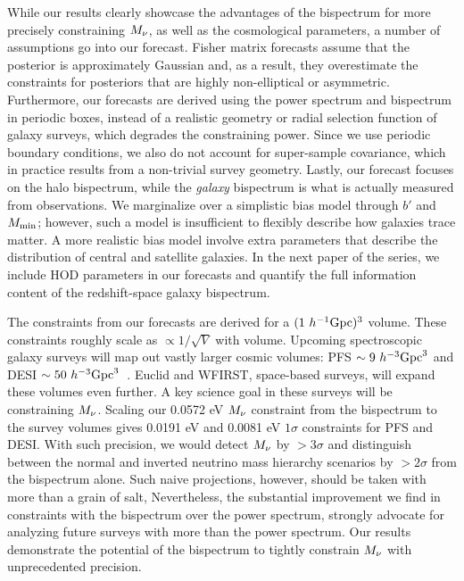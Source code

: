 While our results clearly showcase the advantages of the bispectrum for
more precisely constraining $M_\nu$, as well as the cosmological parameters, 
a number of assumptions go into our forecast. Fisher matrix forecasts assume 
that the posterior is approximately Gaussian and, as a result, they 
overestimate the constraints for posteriors that are highly non-elliptical 
or asymmetric. Furthermore, our forecasts are derived using the power spectrum 
and bispectrum in periodic boxes, instead of a realistic geometry or 
radial selection function of galaxy surveys, which degrades the constraining power. 
Since we use periodic boundary conditions, we also do not account for super-sample
covariance, which in practice results from a non-trivial survey geometry. Lastly, 
our forecast focuses on the halo bispectrum, while the \emph{galaxy} bispectrum 
is what is actually measured from observations. We marginalize over a simplistic bias 
model through $b'$ and $M_{\rm min}$; however, such a model is insufficient to 
flexibly describe how galaxies trace matter. A more realistic bias model 
involve extra parameters that describe the distribution of central and satellite 
galaxies. In the next paper of the series, we include HOD parameters in our
forecasts and quantify the full information content of the redshift-space 
galaxy bispectrum. 

The constraints from our forecasts are derived for a $(1~h^{-1}{\rm Gpc})^3$ 
volume. These constraints roughly scale as $\propto1/\sqrt{V}$ with volume. 
Upcoming spectroscopic galaxy surveys will map out vastly larger cosmic
volumes: PFS $\sim 9~h^{-3}{\rm Gpc}^3$ and DESI $\sim 50~h^{-3}{\rm Gpc}^3$~\citep{takada2014, desicollaboration2016}. 
Euclid and WFIRST, space-based surveys, will expand these volumes even 
further. A key science goal in these surveys will be constraining $M_\nu$. 
Scaling our 0.0572 eV $M_\nu$ constraint from the bispectrum to the survey 
volumes gives 0.0191 eV and 0.0081 eV $1\sigma$ constraints for PFS 
and DESI. With such precision, we would detect $M_\nu$ by $>3\sigma$ and 
distinguish between the normal and inverted neutrino mass hierarchy scenarios 
by $>2\sigma$ from the bispectrum alone. Such naive projections, however, 
should be taken with more than a grain of salt, Nevertheless, the substantial 
improvement we find in constraints with the bispectrum over the power spectrum, 
strongly advocate for analyzing future surveys with more than the power spectrum. 
Our results demonstrate the potential of the bispectrum to tightly constrain 
$M_\nu$ with unprecedented precision.
